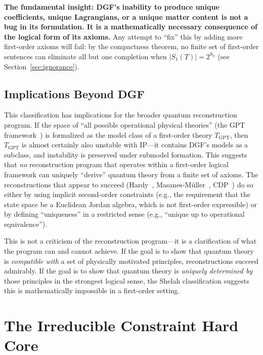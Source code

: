 \documentclass[12pt,a4paper]{article}
\theoremstyle{definition}
\theoremstyle{remark}
\begin{document}
\textbf{The fundamental insight: DGF's inability to produce unique coefficients, unique Lagrangians, or a unique matter content is not a bug in its formulation. It is a mathematically necessary consequence of the logical form of its axioms.} Any attempt to ``fix'' this by adding more first-order axioms will fail: by the compactness theorem, no finite set of first-order sentences can eliminate all but one completion when $|S_1(T)|=2^{\aleph_0}$ (see Section~\ref{sec:ignorance}).

\subsection{Implications Beyond DGF}

This classification has implications for the broader quantum reconstruction program. If the space of ``all possible operational physical theories'' (the GPT framework~\cite{Barrett2007,Hardy2013}) is formalized as the model class of a first-order theory $T_{\mathrm{GPT}}$, then $T_{\mathrm{GPT}}$ is almost certainly also unstable with IP---it contains DGF's models as a subclass, and instability is preserved under submodel formation. This suggests that \emph{no} reconstruction program that operates within a first-order logical framework can uniquely ``derive'' quantum theory from a finite set of axioms. The reconstructions that appear to succeed (Hardy~\cite{Hardy2001}, Masanes-M\"uller~\cite{MasanesMuller2011}, CDP~\cite{CDP2011}) do so either by using implicit second-order constraints (e.g., the requirement that the state space be a Euclidean Jordan algebra, which is not first-order expressible) or by defining ``uniqueness'' in a restricted sense (e.g., ``unique up to operational equivalence'').

This is not a criticism of the reconstruction program---it is a clarification of what the program can and cannot achieve. If the goal is to show that quantum theory is \emph{compatible with} a set of physically motivated principles, reconstructions succeed admirably. If the goal is to show that quantum theory is \emph{uniquely determined by} those principles in the strongest logical sense, the Shelah classification suggests this is mathematically impossible in a first-order setting.

\section{The Irreducible Constraint Hard Core}
\label{sec:hardcore}
\end{document}
